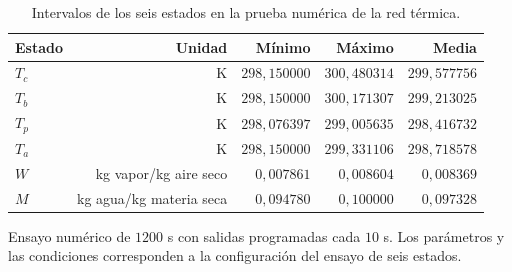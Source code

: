 \begin{table}[htbp]
\centering
\caption{Intervalos de los seis estados en la prueba numérica de la red térmica.}
\label{tab:res_red_estados}
\small
\setlength{\tabcolsep}{5pt}
\begin{tabular}{lrrrr}
\toprule
Estado & Unidad & Mínimo & Máximo & Media \\
\midrule
$T_c$ & K & $298{,}150000$ & $300{,}480314$ & $299{,}577756$ \\
$T_b$ & K & $298{,}150000$ & $300{,}171307$ & $299{,}213025$ \\
$T_p$ & K & $298{,}076397$ & $299{,}005635$ & $298{,}416732$ \\
$T_a$ & K & $298{,}150000$ & $299{,}331106$ & $298{,}718578$ \\
$W$ & kg vapor/kg aire seco & $0{,}007861$ & $0{,}008604$ & $0{,}008369$ \\
$M$ & kg agua/kg materia seca & $0{,}094780$ & $0{,}100000$ & $0{,}097328$ \\
\bottomrule
\end{tabular}
\par\vspace{3pt}
\begin{minipage}{0.98\textwidth}\footnotesize
Ensayo numérico de $1200$ s con salidas programadas cada $10$ s. Los parámetros y las condiciones corresponden a la configuración del ensayo de seis estados.
\end{minipage}
\end{table}
